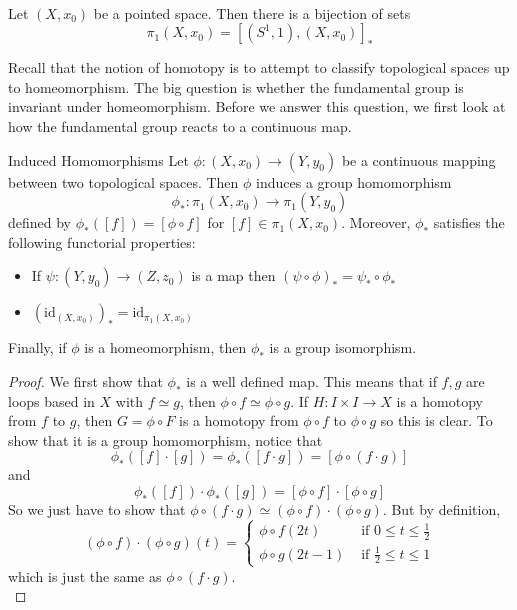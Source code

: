 \documentclass[a4paper]{article}
\begin{document}
\begin{lmm}{}{}\\
Let $(X,x_0)$ be a pointed space. Then there is a bijection of sets $$\pi_1(X,x_0)=[(S^1,1),(X,x_0)]_\ast$$
\end{lmm}

Recall that the notion of homotopy is to attempt to classify topological spaces up to homeomorphism. The big question is whether the fundamental group is invariant under homeomorphism. Before we answer this question, we first look at how the fundamental group reacts to a continuous map. 

\begin{thm}{Induced Homomorphisms}{} Let $\phi:(X,x_0)\to(Y,y_0)$ be a continuous mapping between two topological spaces. Then $\phi$ induces a group homomorphism $$\phi_\ast:\pi_1(X,x_0)\to\pi_1(Y,y_0)$$ defined by $\phi_\ast([f])=[\phi\circ f]$ for $[f]\in\pi_1(X,x_0)$. Moreover, $\phi_\ast$ satisfies the following functorial properties:
\begin{itemize}
\item If $\psi:(Y,y_0)\to(Z,z_0)$ is a map then $(\psi\circ\phi)_\ast=\psi_\ast\circ\phi_\ast$
\item $(\text{id}_{(X,x_0)})_\ast=\text{id}_{\pi_1(X,x_0)}$
\end{itemize}
Finally, if $\phi$ is a homeomorphism, then $\phi_\ast$ is a group isomorphism. 
\begin{proof}
We first show that $\phi_\ast$ is a well defined map. This means that if $f,g$ are loops based in $X$ with $f\simeq g$, then $\phi\circ f\simeq\phi\circ g$. If $H:I\times I\to X$ is a homotopy from $f$ to $g$, then $G=\phi\circ F$ is a homotopy from $\phi\circ f$ to $\phi\circ g$ so this is clear. To show that it is a group homomorphism, notice that $$\phi_\ast([f]\cdot[g])=\phi_\ast([f\cdot g])=[\phi\circ(f\cdot g)]$$ and $$\phi_\ast([f])\cdot\phi_\ast([g])=[\phi\circ f]\cdot[\phi\circ g]$$ So we just have to show that $\phi\circ (f\cdot g)\simeq (\phi\circ f)\cdot(\phi\circ g)$. But by definition, $$(\phi\circ f)\cdot(\phi\circ g)(t)=\begin{cases}
\phi\circ f(2t) & \text{ if } 0\leq t\leq\frac{1}{2}\\
\phi\circ g(2t-1) & \text{ if } \frac{1}{2}\leq t\leq 1
\end{cases}$$ which is just the same as $\phi\circ(f\cdot g)$. \\


\end{proof}
\end{thm}
\end{document}
